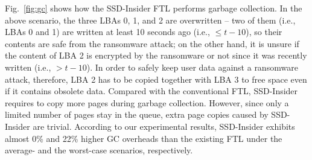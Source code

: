 \documentclass[conference]{IEEEtran}
\newcommand{\ours}{SSD-Insider}
\begin{document}
Fig.~\ref{fig:gc} shows how the \ours{} FTL performs garbage collection.  In
the above scenario, the three LBAs 0, 1, and 2 are overwritten -- two of them
(i.e., LBAs 0 and 1) are written at least 10 seconds ago (i.e., $\leq t-10$),
so their contents are safe from the ransomware attack; on the other hand, it is
unsure if the content of LBA 2 is encrypted by the ransomware or not since it
was recently written (i.e., $> t- 10$).  In order to safely keep user data
against a ransomware attack, therefore, LBA 2 has to be copied together with
LBA 3 to free space even if it contains obsolete data.  Compared with the
conventional FTL, \ours{} requires to copy more pages during garbage
collection.  However, since only a limited number of pages stay in the queue,
extra page copies caused by \ours{} are trivial.  According to our experimental
results, \ours{} exhibits almost 0\% and 22\% higher GC overheads than
the existing FTL under the average- and the worst-case scenarios, respectively.
\end{document}
